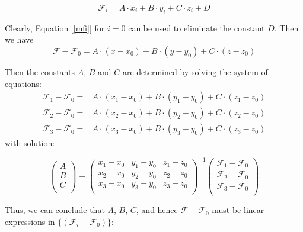 \documentclass[10pt]{article}
\begin{document}
\begin{equation}\label{mfi}
\mathcal{F}_i= A\cdot x_i+B \cdot y_i +C \cdot z_i + D
\end{equation}

Clearly, Equation [\ref{mfi}] for $i=0$ can be used to eliminate the constant $D$. Then we have
\begin{equation}\label{mf-d}
\mathcal{F}-\mathcal{F}_0= A\cdot (x-x_0)+B \cdot (y-y_0) +C \cdot (z-z_0)
\end{equation}

Then the constants $A$, $B$ and $C$ are determined by solving the system of equations:
\begin{equation}\label{mf-d}
\begin{align}
\mathcal{F}_1-\mathcal{F}_0=& A\cdot (x_1-x_0)+B \cdot (y_1-y_0) +C \cdot (z_1-z_0)\\
\mathcal{F}_2-\mathcal{F}_0=& A\cdot (x_2-x_0)+B \cdot (y_2-y_0) +C \cdot (z_2-z_0)\\
\mathcal{F}_3-\mathcal{F}_0=& A\cdot (x_3-x_0)+B \cdot (y_3-y_0) +C \cdot (z_3-z_0)
\end{align}
\end{equation}
with solution:

\begin{equation}\label{abc}
\begin{pmatrix}
  A \\
  B \\
  C \\
\end{pmatrix}
=\begin{pmatrix}
  x_1-x_0 & y_1-y_0 & z_1-z_0 \\
  x_2-x_0 & y_2-y_0 & z_2-z_0 \\
  x_3-x_0 & y_3-y_0 & z_3-z_0 \\
\end{pmatrix}^{-1}\begin{pmatrix}
  \mathcal{F}_1-\mathcal{F}_0\\
  \mathcal{F}_2-\mathcal{F}_0 \\
  \mathcal{F}_3-\mathcal{F}_0 \\
\end{pmatrix}
\end{equation}

Thus, we can conclude that $A$, $B$, $C$, and hence $\mathcal{F}-\mathcal{F}_0$ must be linear
expressions in $\{(\mathcal{F}_i-\mathcal{F}_0)\}$:
\end{document}
